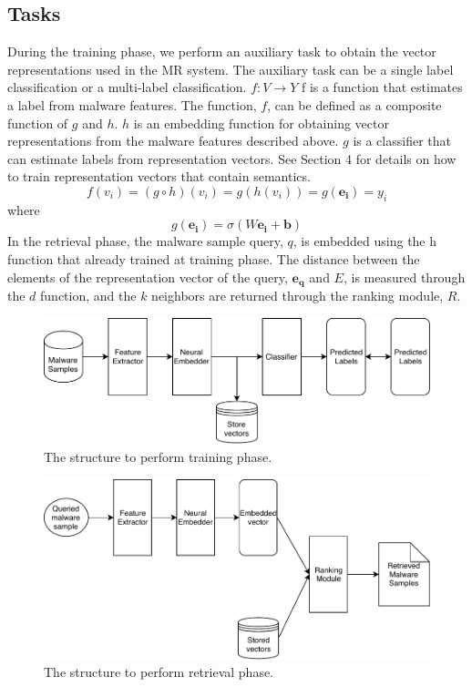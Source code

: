 \subsection{Tasks}
During the training phase, we perform an auxiliary task to obtain the vector representations used in the MR system. The auxiliary task can be a single label classification or a multi-label classification. $f: V \rightarrow Y $ f is a function that estimates a label from malware features. The function, $f$, can be defined as a composite function of $g$ and $h$. $h$ is an embedding function for obtaining vector representations from the malware features described above. $g$ is a classifier that can estimate labels from representation vectors. See Section 4 for details on how to train representation vectors that contain semantics.
\[
f(v_i) = (g \circ h)(v_i) = g(h(v_i)) = g(\mathbf{e_i}) = y_i 
\]
where
\[
g(\mathbf{e_i}) = \sigma (W\mathbf{e_i} + \mathbf{b}) 
\]
In the retrieval phase, the malware sample query, $q$, is embedded using the h function that already trained at training phase. The distance between the elements of the representation vector of the query, $\mathbf{e_q}$ and $E$, is measured through the $d$ function, and the $k$ neighbors are returned through the ranking module, $R$.


\begin{figure}[!htb] %
  \includegraphics[width=\linewidth]{../../figures/train_phase.pdf}
  \caption{The structure to perform training phase.}
  \label{fig:train_phase}
\end{figure}

\begin{figure}[!htb] %
  \includegraphics[width=\linewidth]{../../figures/retrieval_phase.pdf}
  \caption{The structure to perform retrieval phase.}
  \label{fig:retrieval_phase}
\end{figure}


